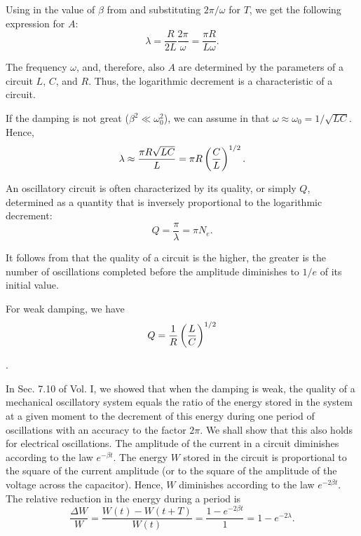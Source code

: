 Using in  the value of $\beta$ from  and substituting $2\pi/\omega$ for $T$, we get the following expression for $A$:
\begin{equation}\label{eq:13_19}
    \lambda = \frac{R}{2L} \frac{2\pi}{\omega} = \frac{\pi R}{L\omega}.
\end{equation}

\noindent
The frequency $\omega$, and, therefore, also $A$ are determined by the parameters of a circuit $L$, $C$, and $R$.
Thus, the logarithmic decrement is a characteristic of a circuit.

If the damping is not great ($\beta^2\ll\omega_0^2$), we can assume in  that $\omega\approx\omega_0 = 1/\sqrt{LC}$.
Hence,
\begin{equation}\label{eq:13_20}
    \lambda \approx \frac{\pi R \sqrt{LC}}{L} = \pi R \left(\frac{C}{L}\right)^{1/2}.
\end{equation}

An oscillatory circuit is often characterized by its quality, or simply $Q$, determined as a quantity that is inversely proportional to the logarithmic decrement:
\vspace{-12pt}
\begin{equation}\label{eq:13_21}
    Q = \frac{\pi}{\lambda} = \pi N_e.
\end{equation}

\noindent
It follows from  that the quality of a circuit is the higher, the greater is the number of oscillations completed before the amplitude diminishes to $1/e$ of its initial value.

For weak damping, we have
\begin{equation}\label{eq:13_22}
    Q = \frac{1}{R} \left(\frac{L}{C}\right)^{1/2}
\end{equation}

.

In Sec. 7.10 of Vol. I, we showed that when the damping is weak, the quality of a mechanical oscillatory system equals the ratio of the energy stored in the system at a given moment to the decrement of this energy during one period of oscillations with an accuracy to the factor $2\pi$.
We shall show that this also holds for electrical oscillations.
The amplitude of the current in a circuit diminishes according to the law $e^{-\beta t}$.
The energy $W$ stored in the circuit is proportional to the square of the current amplitude (or to the square of the amplitude of the voltage across the capacitor).
Hence, $W$ diminishes according to the law $e^{-2\beta t}$.
The relative reduction in the energy during a period is
\begin{equation*}
    \frac{\Delta{W}}{W} = \frac{W(t) - W(t+T)}{W(t)} = \frac{1 - e^{-2\beta t}}{1} = 1 - e^{-2\lambda}.
\end{equation*}

